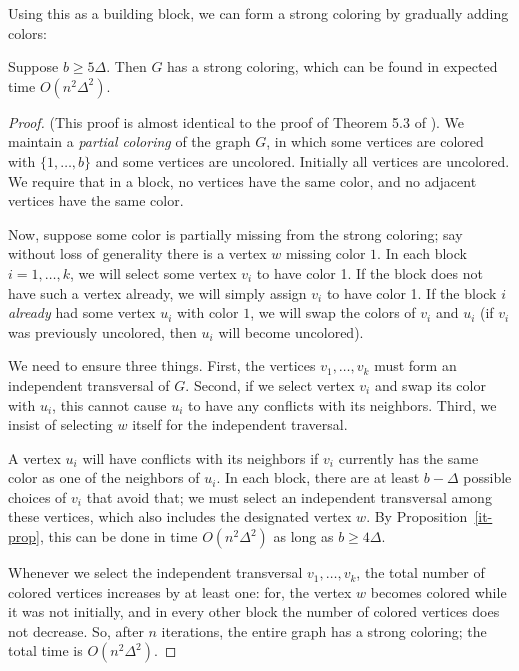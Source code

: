 Using this as a building block, we can form a strong coloring by gradually adding colors:
\begin{theorem}
\label{strong-color-thm2}
Suppose $b \geq 5 \Delta$. Then $G$ has a strong coloring, which can be found in expected time $O(n^2 \Delta^2)$.
\end{theorem}
\begin{proof}
(This proof is almost identical to the proof of Theorem 5.3 of \cite{aharoni}). We maintain a \emph{partial coloring} of the graph $G$, in which some vertices are colored with $\{1, \dots, b\}$ and some vertices are uncolored. Initially all vertices are uncolored. We require that in a block, no vertices have the same color, and no adjacent vertices have the same color. 

Now, suppose some color is partially missing from the strong coloring; say without loss of generality there is a vertex $w$ missing color $1$. In each block $i = 1,\dots, k$, we will select some vertex $v_i$ to have color 1. If the block does not have such a vertex already, we will simply assign $v_i$ to have color 1. If the block $i$ \emph{already} had some vertex $u_i$ with color $1$, we will swap the colors of $v_i$ and $u_i$ (if $v_i$ was previously uncolored, then $u_i$ will become uncolored).

We need to ensure three things. First, the vertices $v_1, \dots, v_k$ must form an independent transversal of $G$. Second, if we select vertex $v_i$ and swap its color with $u_i$, this cannot cause $u_i$ to have any conflicts with its neighbors. Third, we insist of selecting $w$ itself for the independent traversal. 

A vertex $u_i$ will have conflicts with its neighbors if $v_i$ currently has the same color as one of the neighbors of $u_i$. In each block, there are at least $b - \Delta$ possible choices of $v_i$ that avoid that; we must select an independent transversal among these vertices, which also includes the designated vertex $w$. By Proposition~\ref{it-prop}, this can be done in time $O(n^2 \Delta^2)$ as long as $b \geq 4 \Delta$.

Whenever we select the independent transversal $v_1, \dots, v_k$, the total number of colored vertices increases by at least one: for, the vertex $w$ becomes colored while it was not initially, and in every other block the number of colored vertices does not decrease. So, after $n$ iterations, the entire graph has a strong coloring; the total time is $O(n^2 \Delta^2)$.
\end{proof}

